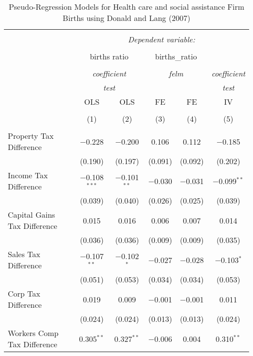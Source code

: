 
\begin{table}[!htbp] \centering 
  \caption{Pseudo-Regression Models for  Health care and social assistance Firm Births using Donald and Lang (2007)} 
  \label{} 
\begin{tabular}{@{\extracolsep{5pt}}lccccc} 
\\[-1.8ex]\hline 
\hline \\[-1.8ex] 
 & \multicolumn{5}{c}{\textit{Dependent variable:}} \\ 
\cline{2-6} 
\\[-1.8ex] & \multicolumn{2}{c}{births ratio} & \multicolumn{2}{c}{births\_ratio} &   \\ 
\\[-1.8ex] & \multicolumn{2}{c}{\textit{coefficient}} & \multicolumn{2}{c}{\textit{felm}} & \textit{coefficient} \\ 
 & \multicolumn{2}{c}{\textit{test}} & \multicolumn{2}{c}{\textit{}} & \textit{test} \\ 
 & OLS & OLS & FE & FE & IV \\ 
\\[-1.8ex] & (1) & (2) & (3) & (4) & (5)\\ 
\hline \\[-1.8ex] 
 Property Tax Difference & $-$0.228 & $-$0.200 & 0.106 & 0.112 & $-$0.185 \\ 
  & (0.190) & (0.197) & (0.091) & (0.092) & (0.202) \\ 
  Income Tax Difference & $-$0.108$^{***}$ & $-$0.101$^{**}$ & $-$0.030 & $-$0.031 & $-$0.099$^{**}$ \\ 
  & (0.039) & (0.040) & (0.026) & (0.025) & (0.039) \\ 
  Capital Gains Tax Difference & 0.015 & 0.016 & 0.006 & 0.007 & 0.014 \\ 
  & (0.036) & (0.036) & (0.009) & (0.009) & (0.035) \\ 
  Sales Tax Difference & $-$0.107$^{**}$ & $-$0.102$^{*}$ & $-$0.027 & $-$0.028 & $-$0.103$^{*}$ \\ 
  & (0.051) & (0.053) & (0.034) & (0.034) & (0.053) \\ 
  Corp Tax Difference & 0.019 & 0.009 & $-$0.001 & $-$0.001 & 0.011 \\ 
  & (0.024) & (0.024) & (0.013) & (0.013) & (0.024) \\ 
  Workers Comp Tax Difference & 0.305$^{**}$ & 0.327$^{**}$ & $-$0.006 & 0.004 & 0.310$^{**}$ \\ 

\end{tabular}
\end{table}
